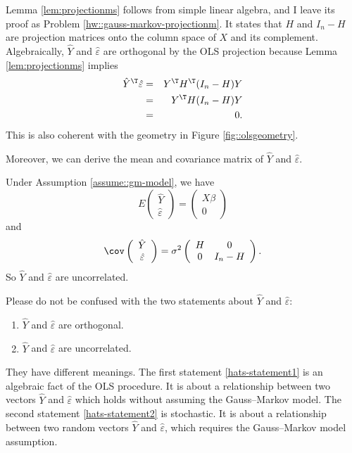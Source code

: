 Lemma \ref{lem:projectionms} follows from simple linear algebra, and I leave its proof as Problem \ref{hw::gauss-markov-projectionm}. It states that $H$ and $I_{n}-H$ are projection matrices onto the column space of $X$ and its complement. 
 Algebraically, $\hat{Y}$ and $\hat{\varepsilon}$ are orthogonal
by the OLS projection because Lemma \ref{lem:projectionms} implies
\begin{eqnarray*}
\hat{Y}^{\T}\hat{\varepsilon} &=& Y^{\T}H^{\T}(I_{n}-H)Y  \\
&=&  Y^{\T}H(I_{n}-H)Y \\
&=& 0.
\end{eqnarray*}
This is also coherent with the geometry in Figure \ref{fig::olsgeometry}. 
 

Moreover, we can derive the mean and covariance matrix of $\hat{Y}$
and $\hat{\varepsilon}$.
\begin{theorem}
\label{thm:GMcov}Under Assumption \ref{assume::gm-model}, we have 
\[
E\left(\begin{array}{c}
\hat{Y}\\
\hat{\varepsilon}
\end{array}\right)=\left(\begin{array}{c}
X\beta\\
0
\end{array}\right)
\]
and 
\[
\cov\left(\begin{array}{c}
\hat{Y}\\
\hat{\varepsilon}
\end{array}\right)=\sigma^{2}\left(\begin{array}{cc}
H & 0 \\
0 & I_{n}-H
\end{array}\right).
\]
So $\hat{Y}$ and $\hat{\varepsilon}$
are uncorrelated. 
\end{theorem}


Please do not be confused with the two statements about $\hat{Y}$ and $\hat{\varepsilon}$:
\begin{enumerate}[label=(S\arabic*), ref=S\arabic*]
\item\label{hats-statement1}
$\hat{Y}$ and $\hat{\varepsilon}$ are orthogonal. 
\item\label{hats-statement2}
$\hat{Y}$ and $\hat{\varepsilon}$ are uncorrelated.
\end{enumerate}
They have different meanings. 
The first statement \eqref{hats-statement1} is an algebraic fact of the OLS procedure. It is about a relationship between two vectors $\hat{Y}$ and $\hat{\varepsilon}$ which holds without assuming the Gauss--Markov model. 
The second statement \eqref{hats-statement2} is stochastic. It is about a relationship between two random vectors $\hat{Y}$ and $\hat{\varepsilon}$, which requires the Gauss--Markov model assumption. 


